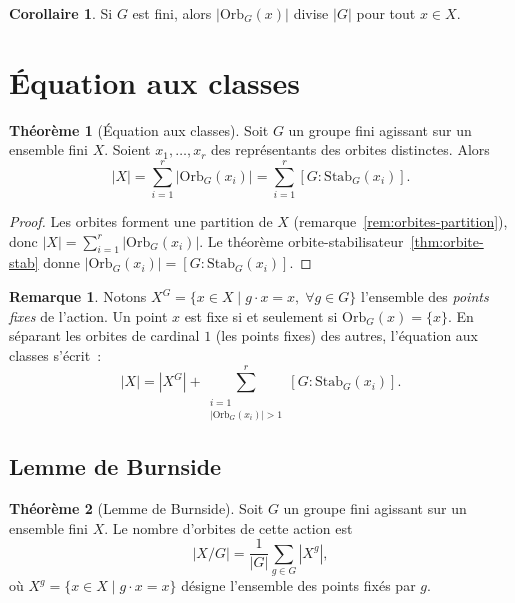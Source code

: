 \documentclass[12pt,a4paper,openany]{book}
\theoremstyle{definition}
\newtheorem{theoreme}{Théorème}[chapter]
\newtheorem{corollaire}{Corollaire}[chapter]
\newtheorem{remarque}{Remarque}[chapter]
\begin{document}
\begin{corollaire}\label{cor:orbite-divise}
  Si $G$ est fini, alors $|\mathrm{Orb}_G(x)|$ divise $|G|$ pour tout
  $x\in X$.
\end{corollaire}

\section{Équation aux classes}\label{sec:equation-classes}

\begin{theoreme}[Équation aux classes]\label{thm:equation-classes}
  Soit $G$ un groupe fini agissant sur un ensemble fini $X$. Soient
  $x_1,\ldots,x_r$ des représentants des orbites distinctes.
  Alors
  \[
    |X| = \sum_{i=1}^{r} |\mathrm{Orb}_G(x_i)|
    = \sum_{i=1}^{r} [G:\mathrm{Stab}_G(x_i)].
  \]
\end{theoreme}

\begin{proof}
  Les orbites forment une partition de $X$
  (remarque~\ref{rem:orbites-partition}), donc
  $|X| = \sum_{i=1}^{r} |\mathrm{Orb}_G(x_i)|$.
  Le théorème orbite-stabilisateur~\ref{thm:orbite-stab} donne
  $|\mathrm{Orb}_G(x_i)| = [G:\mathrm{Stab}_G(x_i)]$.
\end{proof}

\begin{remarque}\label{rem:points-fixes}
  Notons $X^G = \{x\in X\mid g\cdot x = x,\;\forall g\in G\}$
  l'ensemble des \emph{points fixes} de l'action.
  Un point $x$ est fixe si et seulement si $\mathrm{Orb}_G(x) = \{x\}$.
  En séparant les orbites de cardinal $1$ (les points fixes) des autres,
  l'équation aux classes s'écrit~:
  \[
    |X| = |X^G| + \sum_{\substack{i=1\\|\mathrm{Orb}_G(x_i)|>1}}^{r}
    [G:\mathrm{Stab}_G(x_i)].
  \]
\end{remarque}

\subsection{Lemme de Burnside}\label{subsec:burnside}

\begin{theoreme}[Lemme de Burnside]\label{thm:burnside}
  Soit $G$ un groupe fini agissant sur un ensemble fini $X$. Le nombre
  d'orbites de cette action est
  \[
    |X/G| = \frac{1}{|G|}\sum_{g\in G} |X^g|,
  \]
  où $X^g = \{x\in X\mid g\cdot x = x\}$ désigne l'ensemble des
  points fixés par $g$.
\end{theoreme}
\end{document}
